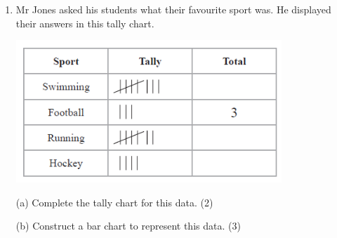 \documentclass{article}
\begin{document}
\begin{enumerate}
\hfill\raggedright (Total for Question 20 is 1 mark) 
\vspace{5pt}
\hline
\vspace{7pt}

\vspace{5pt}
\rule{\linewidth}{2pt} \\ 
\hfill\raggedright \textbf{TOTAL FOR SECTION A IS 20 MARKS} 
\vspace{5pt}

\newpage

\begin{center}
\textbf{SECTION B} \\
\vspace{10pt}
\textbf{Answer all questions.}
\end{center}

\item \quad Mr Jones asked his students what their favourite sport was.
He displayed their answers in this tally chart.

\begin{center}
\includegraphics[width=10cm]{Exams/Tallies_Sports_Mr_Jones.png}
\end{center}

(a) Complete the tally chart for this data. \hspace{6cm} (2)

\vspace{25pt}

(b) Construct a bar chart to represent this data. \hspace{4.65cm} (3)


\end{enumerate}
\end{document}
